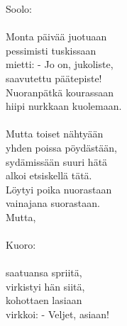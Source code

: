 
Soolo: \\ \hspace{10mm} \\ Monta päivää juotuaan \\ pessimisti tuskissaan \\ mietti: - Jo on, jukoliste, \\ saavutettu päätepiste! \\ Nuoranpätkä kourassaan \\ hiipi nurkkaan kuolemaan. \\ \hspace{10mm} \\ Mutta toiset nähtyään \\ yhden poissa pöydästään, \\ sydämissään suuri hätä \\ alkoi etsiskellä tätä. \\ Löytyi poika nuorastaan \\ vainajana suorastaan. \\ Mutta, \\ \hspace{10mm} \\ Kuoro: \\ \hspace{10mm} \\ saatuansa spriitä, \\ virkistyi hän siitä, \\ kohottaen lasiaan \\ virkkoi: - Veljet, asiaan!